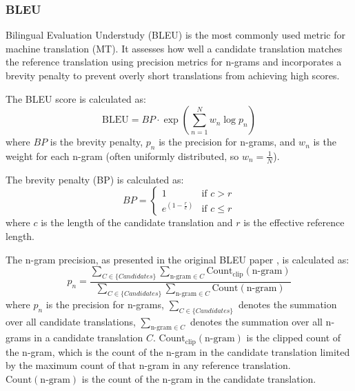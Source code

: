\documentclass[a4paper, 11pt]{article}
\begin{document}
\subsubsection{BLEU}

Bilingual Evaluation Understudy (BLEU) \cite{papieni-2002-bleu} is the most commonly used metric for machine translation (MT). It assesses how well a candidate translation matches the reference translation using precision metrics for n-grams and incorporates a brevity penalty to prevent overly short translations from achieving high scores.

The BLEU score is calculated as:
\begin{equation}
    \text{BLEU} = BP \cdot \exp \left( \sum_{n=1}^{N} w_n \log p_n \right)
\end{equation}
where \( BP \) is the brevity penalty, \( p_n \) is the precision for n-grams, and \( w_n \) is the weight for each n-gram (often uniformly distributed, so \( w_n = \frac{1}{N} \)).

The brevity penalty (BP) is calculated as:
\begin{equation}
    BP = \begin{cases}
        1                     & \text{if } c > r    \\
        e^{(1 - \frac{r}{c})} & \text{if } c \leq r
    \end{cases}
\end{equation}
where \( c \) is the length of the candidate translation and \( r \) is the effective reference length.

The n-gram precision, as presented in the original BLEU paper \cite{papieni-2002-bleu}, is calculated as:
\begin{equation}
    p_n = \frac{\sum_{C \in \{Candidates\}} \sum_{\text{n-gram} \in C} \text{Count}_{\text{clip}}(\text{n-gram})}{\sum_{C \in \{Candidates\}} \sum_{\text{n-gram} \in C} \text{Count}(\text{n-gram})}
\end{equation}
where \( p_n \) is the precision for n-grams, \( \sum_{C \in \{Candidates\}} \) denotes the summation over all candidate translations, \( \sum_{\text{n-gram} \in C} \) denotes the summation over all n-grams in a candidate translation \( C \). \( \text{Count}_{\text{clip}}(\text{n-gram}) \) is the clipped count of the n-gram, which is the count of the n-gram in the candidate translation limited by the maximum count of that n-gram in any reference translation. \( \text{Count}(\text{n-gram}) \) is the count of the n-gram in the candidate translation.
\end{document}
